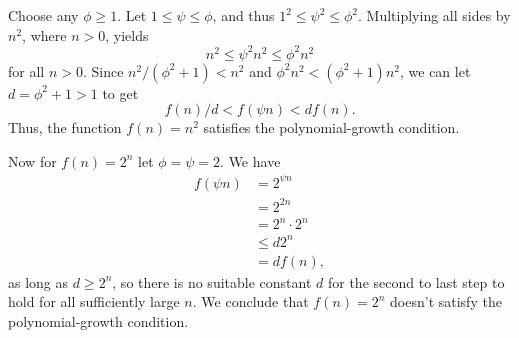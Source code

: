 Choose any $\phi\ge1$.
Let $1\le\psi\le\phi$, and thus $1^2\le\psi^2\le\phi^2$.
Multiplying all sides by $n^2$, where $n>0$, yields
\[
    n^2 \le \psi^2n^2 \le \phi^2n^2
\]
for all $n>0$.
Since $n^2/(\phi^2+1)<n^2$ and $\phi^2n^2<(\phi^2+1)n^2$, we can let $d=\phi^2+1>1$ to get
\[
    f(n)/d < f(\psi n) < df(n).
\]
Thus, the function $f(n)=n^2$ satisfies the polynomial-growth condition.

Now for $f(n)=2^n$ let $\phi=\psi=2$.
We have
\begin{align*}
    f(\psi n) &= 2^{\psi n} \\
    &= 2^{2n} \\
    &= 2^n\cdot2^n \\
    &\le d2^n \\
    &= df(n),
\end{align*}
as long as $d\ge2^n$, so there is no suitable constant $d$ for the second to last step to hold for all sufficiently large $n$.
We conclude that $f(n)=2^n$ doesn't satisfy the polynomial-growth condition.
